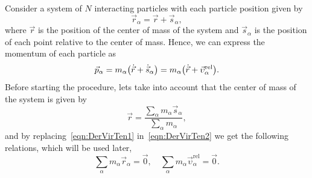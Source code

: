 Consider a system of $N$ interacting particles with each particle position given by
\begin{equation}
    \vec{r}_{\alpha} = \vec{r} + \vec{s}_{\alpha}\label{eqn:DerVirTen1},
\end{equation}
where $\vec{r}$ is the position of the center of mass of the system and $\vec{s}_\alpha$ is the position of each point relative to the center of mass.
Hence, we can express the momentum of each particle as
\begin{equation}
    \vec{p}_\alpha = m_\alpha\qty(\dot{\vec{r}}+\dot{\vec{s}}_\alpha) = m_\alpha\qty(\dot{\vec{r}}+\vec{\upsilon}_\alpha^{\mathrm{rel}}).\label{eqn:DerVirTen2}
\end{equation}
Before starting the procedure, lets take into account that the center of mass of the system is given by
\begin{equation}
    \vec{r} = \frac{\sum_{\alpha}m_\alpha\vec{s}_\alpha}{\sum_{\alpha}m_\alpha}\label{eqn:DerVirTen3},
\end{equation}
and by replacing~\eqref{eqn:DerVirTen1} in~\eqref{eqn:DerVirTen2} we get the following relations, which will be used later,
\begin{equation}
    \sum_\alpha m_\alpha\vec{r}_\alpha = \vec{0},\quad
    \sum_\alpha m_\alpha\vec{\upsilon}_\alpha^{\mathrm{rel}} = \vec{0}.\label{eqn:DerVirTen4}
\end{equation}

